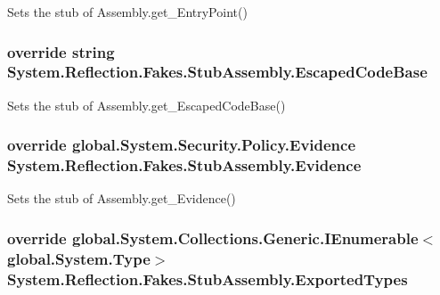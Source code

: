 Sets the stub of Assembly.\-get\-\_\-\-Entry\-Point()

\hypertarget{class_system_1_1_reflection_1_1_fakes_1_1_stub_assembly_a8231ec969c5232f05bc308351ba9fe56}{
\subsubsection[{Escaped\-Code\-Base}]{\setlength{\rightskip}{0pt plus 5cm}override string System.\-Reflection.\-Fakes.\-Stub\-Assembly.\-Escaped\-Code\-Base\hspace{0.3cm}{\ttfamily [get]}}}\label{class_system_1_1_reflection_1_1_fakes_1_1_stub_assembly_a8231ec969c5232f05bc308351ba9fe56}


Sets the stub of Assembly.\-get\-\_\-\-Escaped\-Code\-Base()

\hypertarget{class_system_1_1_reflection_1_1_fakes_1_1_stub_assembly_ad9e0d19f3c3a1728e70942f84ec9b4a8}{
\subsubsection[{Evidence}]{\setlength{\rightskip}{0pt plus 5cm}override global.\-System.\-Security.\-Policy.\-Evidence System.\-Reflection.\-Fakes.\-Stub\-Assembly.\-Evidence\hspace{0.3cm}{\ttfamily [get]}}}\label{class_system_1_1_reflection_1_1_fakes_1_1_stub_assembly_ad9e0d19f3c3a1728e70942f84ec9b4a8}


Sets the stub of Assembly.\-get\-\_\-\-Evidence()

\hypertarget{class_system_1_1_reflection_1_1_fakes_1_1_stub_assembly_a4756fa318483379cbc25cc20633d6342}{
\subsubsection[{Exported\-Types}]{\setlength{\rightskip}{0pt plus 5cm}override global.\-System.\-Collections.\-Generic.\-I\-Enumerable$<$global.\-System.\-Type$>$ System.\-Reflection.\-Fakes.\-Stub\-Assembly.\-Exported\-Types\hspace{0.3cm}{\ttfamily [get]}}}\label{class_system_1_1_reflection_1_1_fakes_1_1_stub_assembly_a4756fa318483379cbc25cc20633d6342}


